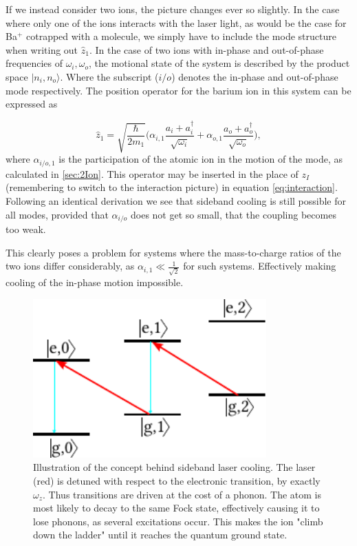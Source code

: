 If we instead consider two ions, the picture changes ever so slightly. In the case where only one of the ions interacts with the laser light, as would be the case for Ba$^+$ cotrapped with a molecule, we simply have to include the mode structure when writing out $\hat{z}_1$. In the case of two ions with in-phase and out-of-phase frequencies of $\omega_i,\omega_o$, the motional state of the system is described by the product space $\vert n_i,n_o\rangle$.
Where the subscript ($i/o$) denotes the in-phase and out-of-phase mode respectively. The position operator for the barium ion in this system can be expressed as

\begin{equation}
    \hat{z}_1 = \sqrt{\frac{\hbar}{2m_1}}\bigg(\alpha_{i,1}\frac{a_i+a_i^\dagger}{\sqrt{\omega_i}}+\alpha_{o,1}\frac{a_o+a_o^\dagger}{\sqrt{\omega_o}}\bigg),
\end{equation}
where $\alpha_{i/o,1}$ is the participation of the atomic ion in the motion of the mode, as calculated in \cref{sec:2Ion}. This operator may be inserted in the place of $z_I$ (remembering to switch to the interaction picture) in equation \cref{eq:interaction}. Following an identical derivation we see that sideband cooling is still possible for all modes, provided that $\alpha_{i/o}$ does not get so small, that the coupling becomes too weak.

This clearly poses a problem for systems where the mass-to-charge ratios of the two ions differ considerably, as $\alpha_{i,1}\ll \frac{1}{\sqrt{2}}$ for such systems. Effectively making cooling of the in-phase motion impossible.

\begin{figure}
    \centering
    \includegraphics[width = 0.8\textwidth]{main/coolingScheme.pdf}
    \caption{Illustration of the concept behind sideband laser cooling. The laser (red) is detuned with respect to the electronic transition, by exactly $\omega_z$. Thus transitions are driven at the cost of a phonon. The atom is most likely to decay to the same Fock state, effectively causing it to lose phonons, as several excitations occur. This makes the ion "climb down the ladder" until it reaches the quantum ground state.}
    \label{fig:SBC}
\end{figure}

